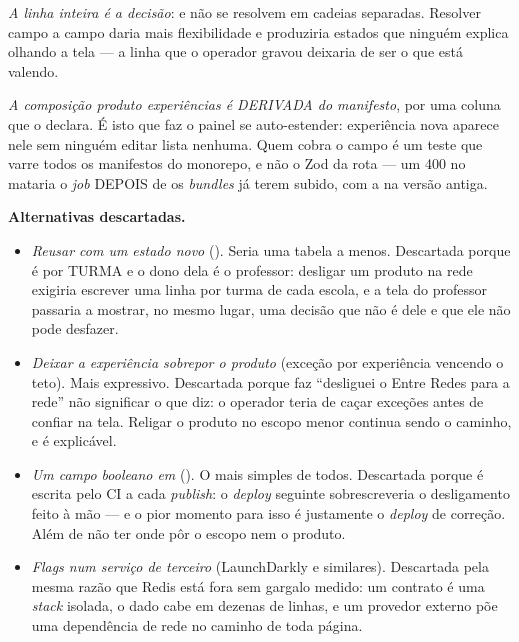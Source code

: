 \emph{A linha inteira é a decisão}:  e  não se
resolvem em cadeias separadas. Resolver campo a campo daria mais flexibilidade e
produziria estados que ninguém explica olhando a tela --- a linha que o operador
gravou deixaria de ser o que está valendo.

\emph{A composição produto \seta{} experiências é DERIVADA do manifesto},
por uma coluna  que o 
declara. É isto que faz o painel se auto-estender: experiência nova aparece nele
sem ninguém editar lista nenhuma. Quem cobra o campo é um teste que varre todos
os manifestos do monorepo, e não o Zod da rota --- um 400 no
 mataria o \emph{job}  DEPOIS
de os \emph{bundles} já terem subido, com a  na versão antiga.

\textbf{Alternativas descartadas.}
\begin{itemize}
  \item \emph{Reusar  com um estado novo} ().
    Seria uma tabela a menos. Descartada porque  é por TURMA e o
    dono dela é o professor: desligar um produto na rede exigiria escrever uma
    linha por turma de cada escola, e a tela do professor passaria a mostrar,
    no mesmo lugar, uma decisão que não é dele e que ele não pode desfazer.
  \item \emph{Deixar a experiência sobrepor o produto} (exceção por experiência
    vencendo o teto). Mais expressivo. Descartada porque faz \enquote{desliguei o
    Entre Redes para a rede} não significar o que diz: o operador teria de caçar
    exceções antes de confiar na tela. Religar o produto no escopo menor
    continua sendo o caminho, e é explicável.
  \item \emph{Um campo booleano em } (). O mais
    simples de todos. Descartada porque  é escrita pelo CI a
    cada \emph{publish}: o \emph{deploy} seguinte sobrescreveria o desligamento
    feito à mão --- e o pior momento para isso é justamente o \emph{deploy} de
    correção. Além de não ter onde pôr o escopo nem o produto.
  \item \emph{Flags num serviço de terceiro} (LaunchDarkly e similares).
    Descartada pela mesma razão que Redis está fora sem gargalo medido: um
    contrato é uma \emph{stack} isolada, o dado cabe em dezenas de linhas, e um
    provedor externo põe uma dependência de rede no caminho de toda página.
\end{itemize}

